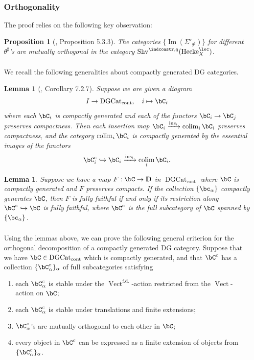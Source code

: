 \documentclass[10pt]{amsart}
\newcommand{\sssec}{\subsubsection}
\newtheorem{lemma}[subsubsection]{Lemma}
\newtheorem{prop}[subsubsection]{Proposition}
\theoremstyle{remark}
\newcommand{\on}{\operatorname}
\newcommand{\DGcat}{\on{DGCat}_{\on{cont}}}
\newcommand{\Vect}{\on{Vect}}
\newcommand{\Shv}{\on{Shv}}
\DeclareMathOperator{\colim}{colim}
\newcommand{\bD}{\mathbf{D}}
\newcommand{\Hecke}{\on{Hecke}}
\begin{document}
\sssec{Orthogonality}
The proof relies on the following key observation:
\begin{prop}[\cite{ZhaoNew}, Proposition 5.3.3]\label{prop: orthogonality}
    The categories $\{\on{Im}(\Sigma'_{\theta^{\sharp}})\}$ for different $\theta^{\sharp}$'s are mutually orthogonal in the category $\Shv^{\indconstr,q}(\Hecke^{\loc}_X)$.
\end{prop}

\sssec{}
We recall the following generalities about compactly generated DG categories. 

\begin{lemma}[\cite{GR}, Corollary 7.2.7]\label{lem: colim cpt gen}
    Suppose we are given a diagram
    \[I\rightarrow\DGcat,\quad i\mapsto \bC_i\]
    where each $\bC_i$ is compactly generated and each of the functors $\bC_i\rightarrow\bC_j$ preserves compactness. Then each insertion map $\bC_i\xrightarrow{\on{ins}_i}\colim_i \bC_i$
    preserves compactness, and the category $\colim_i \bC_i$ is compactly generated by the essential images of the functors
    \[\bC^c_i\hookrightarrow \bC_i\xrightarrow{\on{ins}_i}\colim_i \bC_i.\]
\end{lemma}

\begin{lemma}\label{lem: cpt gen full faithful}
    Suppose we have a map $F:\bC\rightarrow\bD$ in $\DGcat$ where $\bC$ is compactly generated and $F$ preserves compacts. If the collection $\{\bc_{\alpha}\}$ compactly generates $\bC$, then $F$ is fully faithful if and only if its restriction along $\bC^{\circ}\hookrightarrow\bC$ is fully faithful, where $\bC^{\circ}$ is the full subcategory of $\bC$ spanned by $\{\bc_{\alpha}\}$.
\end{lemma}

\sssec{}\label{sssec: setup orthogonal decomposition}
Using the lemmas above, we can prove the following general criterion for the orthogonal decomposition of a compactly generated DG category. 
Suppose that we have $\bC\in\DGcat$ which is compactly generated, and that $\bC^c$ has a collection $\{\bC^c_{\alpha}\}_{\alpha}$ of full subcategories satisfying
\begin{enumerate}
    \item each $\bC^c_{\alpha}$ is stable under the $\Vect^{\on{f.d.}}$-action restricted from the $\Vect$-action on $\bC$;
    \item each $\bC^c_{\alpha}$ is stable under translations and finite extensions;
    \item $\bC^c_{\alpha}$'s are mutually orthogonal to each other in $\bC$;
    \item every object in $\bC^c$ can be expressed as a finite extension of objects from $\{\bC^c_{\alpha}\}_{\alpha}$.
\end{enumerate}
\end{document}
